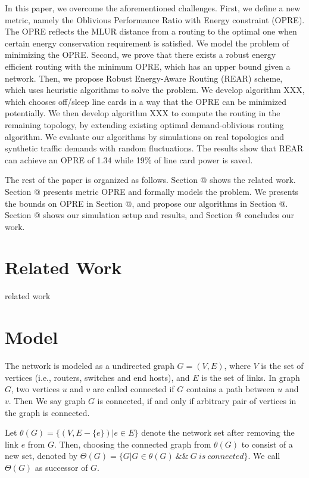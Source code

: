 \documentclass[conference]{IEEEtran}
\makeatletter
\newcommand{\Rmnum}[1]{\expandafter\@slowromancap\romannumeral #1@}
\makeatother
\begin{document}
In this paper, we overcome the aforementioned challenges. First, we define a new metric, namely the Oblivious Performance Ratio with Energy constraint (OPRE). The OPRE reflects the MLUR distance from a routing to the optimal one when certain energy conservation requirement is satisfied. We model the problem of minimizing the OPRE. Second, we prove that there exists a robust energy efficient routing with the minimum OPRE, which has an upper bound given a network. Then, we propose Robust Energy-Aware Routing (REAR) scheme, which uses heuristic algorithms to solve the problem. We develop algorithm XXX, which chooses off/sleep line cards in a way that the OPRE can be minimized potentially. We then develop algorithm XXX to compute the routing in the remaining topology, by extending existing optimal demand-oblivious routing algorithm. We evaluate our algorithms by simulations on real topologies and synthetic traffic demands with random fluctuations. The results show that REAR can achieve an OPRE of 1.34 while 19\% of line card power is saved.

The rest of the paper is organized as follows. Section \Rmnum{2} shows the related work. Section \Rmnum{3} presents metric OPRE and formally models the problem. We presents the bounds on OPRE in Section \Rmnum{4}, and propose our algorithms in Section \Rmnum{5}. Section \Rmnum{6} shows our simulation setup and results, and Section \Rmnum{7} concludes our work.


\section{Related Work}
related work


\section{Model}
The network is modeled as a undirected graph $G = (V, E)$, where $V$ is the set of vertices (i.e., routers, switches 
and end hosts), and $E$ is the set of links. In graph $G$, two vertices $u$ and $v$
are called connected if $G$ contains a path between $u$ and $v$. Then We say graph $G$ is connected, if and only if 
arbitrary pair of vertices in the graph is connected.

Let $\theta(G) = \{ (V, E - \{ e \}) | e \in E \}$ denote the network set after removing the link $e$ from
$G$. Then, choosing the connected graph from $\theta(G)$ to consist of a new set, denoted by 
$\Theta(G) = \{G | G \in \theta(G) \ \&\& \ G\ is\ connected\}$. We call $\Theta(G)$ as successor of $G$.
\end{document}
